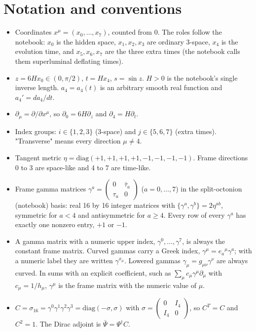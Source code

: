 \documentclass[11pt]{article}
\begin{document}
\section{Notation and conventions}

\begin{itemize}
\item Coordinates $x^\mu=(x_0,\dots,x_7)$, counted from 0. The roles follow the notebook: $x_0$ is the hidden space, $x_1,x_2,x_3$ are ordinary 3-space, $x_4$ is the evolution time, and $x_5,x_6,x_7$ are the three extra times (the notebook calls them superluminal deflating times).
\item $z=6Hx_0\in(0,\pi/2)$, $t=Hx_4$, $s=\sin z$. $H>0$ is the notebook's single inverse length. $a_4=a_4(t)$ is an arbitrary smooth real function and $a_4'=da_4/dt$.
\item $\partial_\mu=\partial/\partial x^\mu$, so $\partial_0=6H\partial_z$ and $\partial_4=H\partial_t$.
\item Index groups: $i\in\{1,2,3\}$ (3-space) and $j\in\{5,6,7\}$ (extra times). "Transverse" means every direction $\mu\ne4$.
\item Tangent metric $\eta=\mathrm{diag}(+1,+1,+1,+1,-1,-1,-1,-1)$. Frame directions 0 to 3 are space-like and 4 to 7 are time-like.
\item Frame gamma matrices $\gamma^a=\begin{pmatrix}0&\bar\tau_a\\ \tau_a&0\end{pmatrix}$ ($a=0,\dots,7$) in the split-octonion (notebook) basis: real 16 by 16 integer matrices with $\{\gamma^a,\gamma^b\}=2\eta^{ab}$, symmetric for $a<4$ and antisymmetric for $a\ge4$. Every row of every $\gamma^a$ has exactly one nonzero entry, $+1$ or $-1$.
\item A gamma matrix with a numeric upper index, $\gamma^0,\dots,\gamma^7$, is always the constant frame matrix. Curved gammas carry a Greek index, $\gamma^\mu=e_a{}^\mu\gamma^a$; with a numeric label they are written $\gamma^{x_\mu}$. Lowered gammas $\gamma_\mu=g_{\mu\nu}\gamma^\nu$ are always curved. In sums with an explicit coefficient, such as $\sum_\mu c_\mu\gamma^\mu\partial_\mu$ with $c_\mu=1/h_\mu$, $\gamma^\mu$ is the frame matrix with the numeric value of $\mu$.
\item $C=\sigma_{16}=\gamma^0\gamma^1\gamma^2\gamma^3=\mathrm{diag}(-\sigma,\sigma)$ with $\sigma=\begin{pmatrix}0&I_4\\ I_4&0\end{pmatrix}$, so $C^T=C$ and $C^2=1$. The Dirac adjoint is $\bar\Psi=\Psi^\dagger C$.

\end{itemize}
\end{document}
